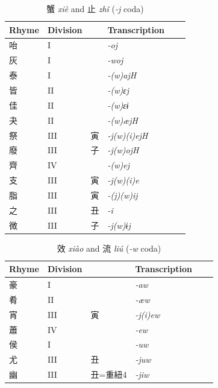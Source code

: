 \documentclass[oneside,a4paper,11pt]{article}
\newcommand{\ipa}[1]{{\phon\textit{#1}}}
\newcommand{\zh}[1]{{\cn #1}}
\newcommand{\zhc}[2]{\zh{#1} \ipa{#2}}
\begin{document}
\begin{table}[H]
\caption{\zhc{蟹}{xiè} and \zhc{止}{zhǐ} (\ipa{-j} coda)} \centering \label{tab:xie.zhi}
\begin{tabular}{llllll}
\toprule
Rhyme & Division & & Transcription \\
\midrule
\zh{咍} &	I &	&	\ipa{-oj} &	\\
\zh{灰} &	I &	&	\ipa{-woj} &	\\
\zh{泰} &	I &	&	\ipa{-(w)ajH} &	\\
\zh{皆} &	II &	&	\ipa{-(w)ɛj} &	\\
\zh{佳} &	II &	&	\ipa{-(w)ɛɨ} &	\\
\zh{夬} &	II &	&	\ipa{-(w)æjH} &	\\
\zh{祭} &	III &	\zh{寅} &	\ipa{-j(w)(i)ejH} &	\\
\zh{廢} &	III &	\zh{子} &	\ipa{-j(w)ojH} &	\\
\zh{齊} &	IV &	&	\ipa{-(w)ej} &	\\
\midrule
\zh{支} &	III &	\zh{寅} &	\ipa{-j(w)(i)e} &	\\
\zh{脂} &	III &	\zh{寅} &	\ipa{-(j)(w)ij} &	\\
\zh{之} &	III &	\zh{丑} &	\ipa{-i} &	\\
\zh{微} &	III &	\zh{子} &	\ipa{-j(w)ɨj} &	\\
\bottomrule
\end{tabular}
\end{table}


\begin{table}[H]
\caption{\zhc{效}{xiào} and \zhc{流}{liú} (\ipa{-w} coda)} \centering \label{tab:xiao}
\begin{tabular}{llllll}
\toprule
Rhyme & Division & & Transcription \\
\midrule
\zh{豪} &	I &	&	\ipa{-aw} &	\\
\zh{肴} &	II &	&	\ipa{-æw} &	\\
\zh{宵} &	III &	\zh{寅} &	\ipa{-j(i)ew} &	\\
\zh{蕭} &	IV &	&	\ipa{-ew} &	\\
\zh{侯} &	I &	&	\ipa{-uw} &	\\
\zh{尤} &	III &	\zh{丑} &	\ipa{-juw} &	\\
\zh{幽} &	III &	\zh{丑}=\zh{重紐}4 &	\ipa{-jiw} &	\\
\bottomrule
\end{tabular}
\end{table}
\end{document}

